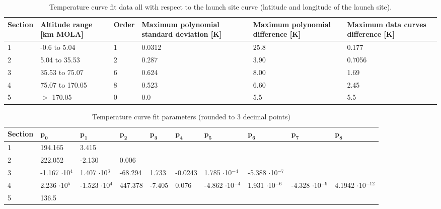 \begin{table}[H]
\begin{center}
\caption{Temperature curve fit data all with respect to the launch site curve (latitude and longitude of the launch site).}
\label{tab:fitDeviations}
\begin{tabularx}{1.0\textwidth}{|l|p{2.2cm}|l|X|X|X|}
\hline 
\small \textbf{Section} & \small \textbf{Altitude range [km MOLA]} & \small \textbf{Order}	& \small \textbf{Maximum polynomial standard deviation [K]} & \small \textbf{Maximum polynomial difference [K]} & \small \textbf{Maximum data curves difference [K]} \\ \hline 
1 & -0.6 to 5.04 & 1 & 0.0312 & 25.8 & 0.177 \\ \hline
2 & 5.04 to 35.53 & 2 & 0.287 & 3.90 & 0.7056 \\ \hline
3 & 35.53 to 75.07 & 6 & 0.624 & 8.00 & 1.69 \\ \hline
4 & 75.07 to 170.05 & 8 & 0.523 & 6.60 & 2.45 \\ \hline
5 & $>$ 170.05 & 0 & 0.0 & 5.5 & 5.5 \\ \hline
\end{tabularx}
\end{center}
\end{table}

\begin{table}[H]
\begin{center}
\caption{Temperature curve fit parameters (rounded to 3 decimal points)}
\label{tab:fitParameters}
\begin{tabular}{|l||p{1.1cm}|p{1.1cm}|p{1.1cm}|p{1.1cm}|p{1.1cm}|p{1.1cm}|p{1.1cm}|p{1.1cm}|p{1.1cm}|}
\hline 
\textbf{Section}  & $\mathbf{p_{0}}$ & $\mathbf{p_{1}}$ & $\mathbf{p_{2}}$ & $\mathbf{p_{3}}$ & $\mathbf{p_{4}}$ & $\mathbf{p_{5}}$ & $\mathbf{p_{6}}$ & $\mathbf{p_{7}}$ & $\mathbf{p_{8}}$ \\ \hline 
1 & 194.165   &  3.415 &  &  &  &  & & &  \\ \hline
2 & 222.052 & -2.130 & 0.006 &  &  & &  &  &    \\ \hline
3 & -1.167 $\cdot$10$^{4}$ & 1.407 $\cdot$10$^{3}$ & -68.294 & 1.733 & -0.0243 &  1.785 $\cdot$10$^{-4}$ & -5.388 $\cdot$10$^{-7}$  &  & \\ \hline
4  & 2.236 $\cdot$10$^{5}$ & -1.523 $\cdot$10$^{4}$ & 447.378 & -7.405 & 0.076 & -4.862 $\cdot$10$^{-4}$ & 1.931 $\cdot$10$^{-6}$ & -4.328 $\cdot$10$^{-9}$ & 4.1942 $\cdot$10$^{-12}$ \\ \hline
5 & 136.5 &&&&&&&& \\ \hline
\end{tabular}
\end{center}
\end{table}



